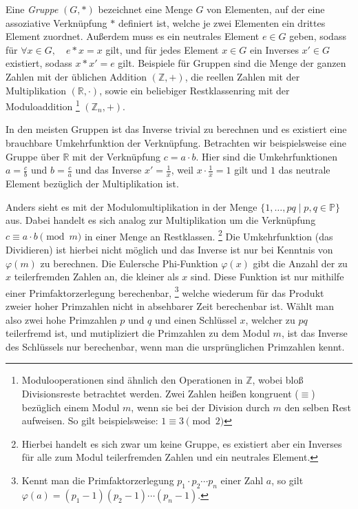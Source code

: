 Eine \emph{Gruppe} $(G,*)$ bezeichnet eine Menge $G$ von Elementen, auf der eine assoziative Verknüpfung $*$ definiert ist, welche je zwei Elementen ein drittes Element zuordnet.
Außerdem muss es ein neutrales Element $e \in G$ geben, sodass für $\forall x \in G, \quad e*x=x$ gilt, und für jedes Element $x \in G$ ein Inverses $x' \in G$ existiert, sodass $x*x'=e$ gilt.
Beispiele für Gruppen sind die Menge der ganzen Zahlen mit der üblichen Addition $(\mathbb{Z}, +)$, die reellen Zahlen mit der Multiplikation $(\mathbb{R}, \cdot)$, sowie ein beliebiger Restklassenring mit der Moduloaddition%
\footnote{Modulooperationen sind ähnlich den Operationen in $\mathbb{Z}$, wobei bloß Divisionsreste betrachtet werden.
Zwei Zahlen heißen kongruent ($\equiv$) bezüglich einem Modul $m$, wenn sie bei der Division durch $m$ den selben Rest aufweisen.
So gilt beispielsweise: $1 \equiv 3 \pmod{2}$}
$(\mathbb{Z}_n, +)$.

In den meisten Gruppen ist das Inverse trivial zu berechnen und es existiert eine brauchbare Umkehrfunktion der Verknüpfung.
Betrachten wir beispielsweise eine Gruppe über $\mathbb{R}$ mit der Verknüpfung $c = a \cdot b$.
Hier sind die Umkehrfunktionen $a = \frac{c}{b}$ und $b = \frac{c}{a}$ und das Inverse $x'=\frac{1}{x}$, weil $x \cdot \frac{1}{x} = 1$ gilt und $1$ das neutrale Element bezüglich der Multiplikation ist.

Anders sieht es mit der Modulomultiplikation in der Menge $\{ 1, \dotsc, pq \mid p,q \in \mathbb{P}\}$ aus.
Dabei handelt es sich analog zur Multiplikation um die Verknüpfung $c \equiv a \cdot b \pmod{m}$ in einer Menge an Restklassen.%
\footnote{Hierbei handelt es sich zwar um keine Gruppe, es existiert aber ein Inverses für alle zum Modul teilerfremden Zahlen und ein neutrales Element. }
Die Umkehrfunktion (das Dividieren) ist hierbei nicht möglich und das Inverse ist nur bei Kenntnis von $\varphi(m)$ zu berechnen.
Die Eulersche Phi-Funktion $\varphi(x)$ gibt die Anzahl der zu $x$ teilerfremden Zahlen an, die kleiner als $x$ sind.
Diese Funktion ist nur mithilfe einer Primfaktorzerlegung berechenbar,%
\footnote{Kennt man die Primfaktorzerlegung $p_1 \cdot p_2 \dotsm p_n$ einer Zahl $a$, so gilt $\varphi (a) = (p_1-1) (p_2-1) \dotsm (p_n-1)$.}
welche wiederum für das Produkt zweier hoher Primzahlen nicht in absehbarer Zeit berechenbar ist.
Wählt man also zwei hohe Primzahlen $p$ und $q$ und einen Schlüssel $x$, welcher zu $pq$ teilerfremd ist, und mutipliziert die Primzahlen zu dem Modul $m$, ist das Inverse des Schlüssels nur berechenbar, wenn man die ursprünglichen Primzahlen kennt.

